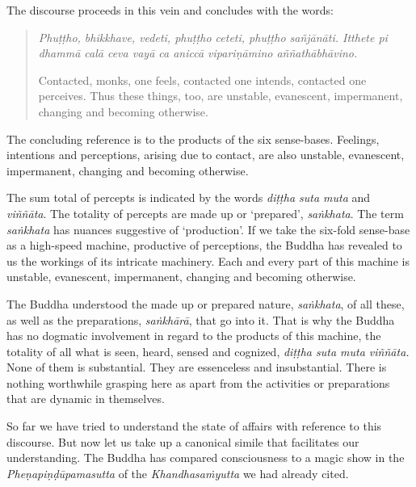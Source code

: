 The discourse proceeds in this vein and concludes with the words:

\begin{quote}
\emph{Phuṭṭho, bhikkhave, vedeti, phuṭṭho ceteti, phuṭṭho sañjānāti. Itthete pi dhammā calā ceva vayā ca aniccā vipariṇāmino aññathābhāvino.}

Contacted, monks, one feels, contacted one intends, contacted one perceives. Thus these things, too, are unstable, evanescent, impermanent, changing and becoming otherwise.
\end{quote}

The concluding reference is to the products of the six sense-bases. Feelings, intentions and perceptions, arising due to contact, are also unstable, evanescent, impermanent, changing and becoming otherwise.

The sum total of percepts is indicated by the words \emph{diṭṭha suta muta} and \emph{viññāta}. The totality of percepts are made up or `prepared', \emph{saṅkhata}. The term \emph{saṅkhata} has nuances suggestive of `production'. If we take the six-fold sense-base as a high-speed machine, productive of perceptions, the Buddha has revealed to us the workings of its intricate machinery. Each and every part of this machine is unstable, evanescent, impermanent, changing and becoming otherwise.

The Buddha understood the made up or prepared nature, \emph{saṅkhata}, of all these, as well as the preparations, \emph{saṅkhārā}, that go into it. That is why the Buddha has no dogmatic involvement in regard to the products of this machine, the totality of all what is seen, heard, sensed and cognized, \emph{diṭṭha suta muta viññāta.} None of them is substantial. They are essenceless and insubstantial. There is nothing worthwhile grasping here as apart from the activities or preparations that are dynamic in themselves.

So far we have tried to understand the state of affairs with reference to this discourse. But now let us take up a canonical simile that facilitates our understanding. The Buddha has compared consciousness to a magic show in the \emph{Pheṇapiṇḍūpamasutta} of the \emph{Khandhasaṁyutta} we had already cited.

